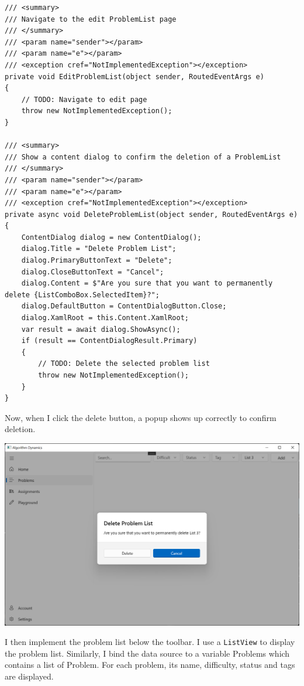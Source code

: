 \documentclass[a4paper]{report}
\begin{document}
\begin{verbatim}
/// <summary>
/// Navigate to the edit ProblemList page
/// </summary>
/// <param name="sender"></param>
/// <param name="e"></param>
/// <exception cref="NotImplementedException"></exception>
private void EditProblemList(object sender, RoutedEventArgs e)
{
    // TODO: Navigate to edit page
    throw new NotImplementedException();
}

/// <summary>
/// Show a content dialog to confirm the deletion of a ProblemList
/// </summary>
/// <param name="sender"></param>
/// <param name="e"></param>
/// <exception cref="NotImplementedException"></exception>
private async void DeleteProblemList(object sender, RoutedEventArgs e)
{
    ContentDialog dialog = new ContentDialog();
    dialog.Title = "Delete Problem List";
    dialog.PrimaryButtonText = "Delete";
    dialog.CloseButtonText = "Cancel";
    dialog.Content = $"Are you sure that you want to permanently delete {ListComboBox.SelectedItem}?";
    dialog.DefaultButton = ContentDialogButton.Close;
    dialog.XamlRoot = this.Content.XamlRoot;
    var result = await dialog.ShowAsync();
    if (result == ContentDialogResult.Primary)
    {
        // TODO: Delete the selected problem list
        throw new NotImplementedException();
    }
}
\end{verbatim}

Now, when I click the delete button, a popup shows up correctly to confirm deletion.

\includegraphics[width=\textwidth, height=\textheight, keepaspectratio]{ProblemsPage-ContentDialog}

I then implement the problem list below the toolbar. I use a \texttt{ListView} to display the problem list. Similarly, I bind the data source to a variable Problems which contains a list of Problem. For each problem, its name, difficulty, status and tags are displayed.
\end{document}
